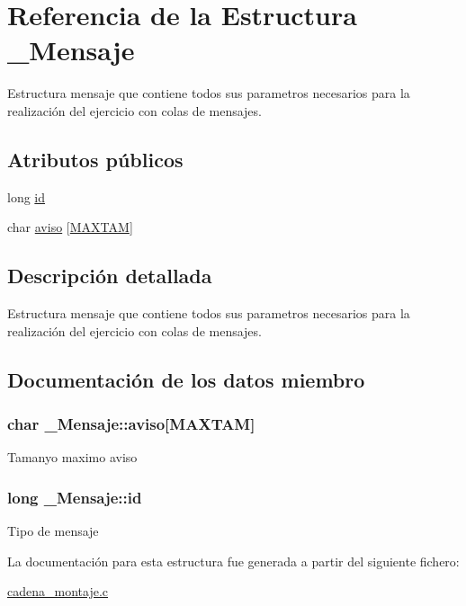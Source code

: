 \hypertarget{struct__Mensaje}{}\section{Referencia de la Estructura \+\_\+\+Mensaje}
\label{struct__Mensaje}


Estructura mensaje que contiene todos sus parametros necesarios para la realización del ejercicio con colas de mensajes.  


\subsection*{Atributos públicos}
\begin{DoxyCompactItemize}
\item 
long \hyperlink{struct__Mensaje_a216a370cde3eae04df6a81fea5bef338}{id}
\item 
char \hyperlink{struct__Mensaje_a4187bae10cdeba06a6a99d6d57e85a54}{aviso} \mbox{[}\hyperlink{cadena__montaje_8c_a0e68c4ad6b4b3a349afa80ebbbdffb13}{M\+A\+X\+T\+AM}\mbox{]}
\end{DoxyCompactItemize}


\subsection{Descripción detallada}
Estructura mensaje que contiene todos sus parametros necesarios para la realización del ejercicio con colas de mensajes. 

\subsection{Documentación de los datos miembro}
\subsubsection[{\texorpdfstring{aviso}{aviso}}]{\setlength{\rightskip}{0pt plus 5cm}char \+\_\+\+Mensaje\+::aviso\mbox{[}{\bf M\+A\+X\+T\+AM}\mbox{]}}\hypertarget{struct__Mensaje_a4187bae10cdeba06a6a99d6d57e85a54}{}\label{struct__Mensaje_a4187bae10cdeba06a6a99d6d57e85a54}
Tamanyo maximo aviso 
\subsubsection[{\texorpdfstring{id}{id}}]{\setlength{\rightskip}{0pt plus 5cm}long \+\_\+\+Mensaje\+::id}\hypertarget{struct__Mensaje_a216a370cde3eae04df6a81fea5bef338}{}\label{struct__Mensaje_a216a370cde3eae04df6a81fea5bef338}
Tipo de mensaje 

La documentación para esta estructura fue generada a partir del siguiente fichero\+:\begin{DoxyCompactItemize}
\item 
\hyperlink{cadena__montaje_8c}{cadena\+\_\+montaje.\+c}\end{DoxyCompactItemize}
